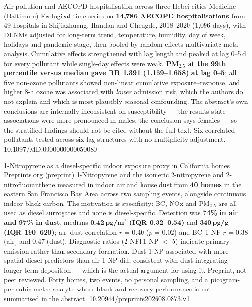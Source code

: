 \documentclass[10pt]{article}
\begin{document}
{Air pollution and AECOPD hospitalisation across three Hebei cities}
{Medicine (Baltimore)}
{Ecological time series on \textbf{14{,}786 AECOPD hospitalisations} from 49 hospitals in
Shijiazhuang, Handan and Chengde, 2018--2020 (1{,}096 days), with DLNMs adjusted for
long-term trend, temperature, humidity, day of week, holidays and pandemic stage, then
pooled by random-effects multivariate meta-analysis. Cumulative effects strengthened with
lag length and peaked at lag 0--5\,d for every pollutant while single-day effects were weak.
\textbf{PM$_{2.5}$ at the 99th percentile versus median gave RR 1.391 (1.169--1.658) at lag
0--5}; all five non-ozone pollutants showed non-linear cumulative exposure--response, and
higher 8-h ozone was associated with \emph{lower} admission risk, which the authors do not
explain and which is most plausibly seasonal confounding. The abstract's own conclusions are
internally inconsistent on susceptibility --- the results state associations were more
pronounced in males, the conclusion says females --- so the stratified findings should not be
cited without the full text. Six correlated pollutants tested across six lag structures with
no multiplicity adjustment.}
{10.1097/MD.0000000000050080}


{1-Nitropyrene as a diesel-specific indoor exposure proxy in California homes}
{Preprints.org (preprint)}
{1-Nitropyrene and the isomeric 2-nitropyrene and 2-nitrofluoranthene measured in indoor air
and house dust from \textbf{40 homes} in the eastern San Francisco Bay Area across two
sampling events, alongside continuous indoor black carbon. The motivation is specificity:
BC, NOx and PM$_{2.5}$ are all used as diesel surrogates and none is diesel-specific.
Detection was \textbf{74\% in air and 97\% in dust}, medians \textbf{0.42\,pg/m$^3$ (IQR
0.32--0.54)} and \textbf{340\,pg/g (IQR 190--620)}; air--dust correlation $r$ = 0.40
($p$ = 0.02) and BC--1-NP $r$ = 0.38 (air) and 0.47 (dust). Diagnostic ratios
(2-NFl:1-NP $<$ 5) indicate primary emission rather than secondary formation. Dust 1-NP
associated with more spatial diesel predictors than air 1-NP did, consistent with dust
integrating longer-term deposition --- which is the actual argument for using it. Preprint,
not peer reviewed. Forty homes, two events, no personal sampling, and a picogram-per-cubic-metre
analyte whose blank and recovery performance is not summarised in the abstract.}
{10.20944/preprints202608.0873.v1}
\end{document}
